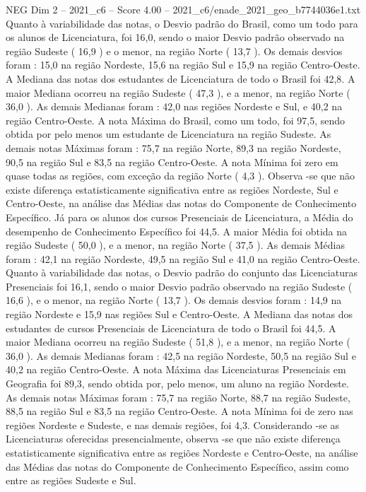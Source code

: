 \begin{textsample}{NEG Dim 2 – 2021\_c6 – Score 4.00 – 2021\_c6/enade\_2021\_geo\_b7744036e1.txt}
Quanto à variabilidade das notas, o Desvio padrão do Brasil, como um todo para os alunos de Licenciatura, foi 16,0, sendo o maior Desvio padrão observado na região Sudeste ( 16,9 ) e o menor, na região Norte ( 13,7 ).
Os demais desvios foram : 15,0 na região Nordeste, 15,6 na região Sul e 15,9 na região Centro-Oeste.
A Mediana das notas dos estudantes de Licenciatura de todo o Brasil foi 42,8.
A maior Mediana ocorreu na região Sudeste ( 47,3 ), e a menor, na região Norte ( 36,0 ).
As demais Medianas foram : 42,0 nas regiões Nordeste e Sul, e 40,2 na região Centro-Oeste.
A nota Máxima do Brasil, como um todo, foi 97,5, sendo obtida por pelo menos um estudante de Licenciatura na região Sudeste.
As demais notas Máximas foram : 75,7 na região Norte, 89,3 na região Nordeste, 90,5 na região Sul e 83,5 na região Centro-Oeste.
A nota Mínima foi zero em quase todas as regiões, com exceção da região Norte ( 4,3 ).
Observa -se que não existe diferença estatisticamente significativa entre as regiões Nordeste, Sul e Centro-Oeste, na análise das Médias das notas do Componente de Conhecimento Específico.
Já para os alunos dos cursos Presenciais de Licenciatura, a Média do desempenho de Conhecimento Específico foi 44,5.
A maior Média foi obtida na região Sudeste ( 50,0 ), e a menor, na região Norte ( 37,5 ).
As demais Médias foram : 42,1 na região Nordeste, 49,5 na região Sul e 41,0 na região Centro-Oeste.
Quanto à variabilidade das notas, o Desvio padrão do conjunto das Licenciaturas Presenciais foi 16,1, sendo o maior Desvio padrão observado na região Sudeste ( 16,6 ), e o menor, na região Norte ( 13,7 ).
Os demais desvios foram : 14,9 na região Nordeste e 15,9 nas regiões Sul e Centro-Oeste.
A Mediana das notas dos estudantes de cursos Presenciais de Licenciatura de todo o Brasil foi 44,5.
A maior Mediana ocorreu na região Sudeste ( 51,8 ), e a menor, na região Norte ( 36,0 ).
As demais Medianas foram : 42,5 na região Nordeste, 50,5 na região Sul e 40,2 na região Centro-Oeste.
A nota Máxima das Licenciaturas Presenciais em Geografia foi 89,3, sendo obtida por, pelo menos, um aluno na região Nordeste.
As demais notas Máximas foram : 75,7 na região Norte, 88,7 na região Sudeste, 88,5 na região Sul e 83,5 na região Centro-Oeste.
A nota Mínima foi de zero nas regiões Nordeste e Sudeste, e nas demais regiões, foi 4,3.
Considerando -se as Licenciaturas oferecidas presencialmente, observa -se que não existe diferença estatisticamente significativa entre as regiões Nordeste e Centro-Oeste, na análise das Médias das notas do Componente de Conhecimento Específico, assim como entre as regiões Sudeste e Sul.

\end{textsample}
